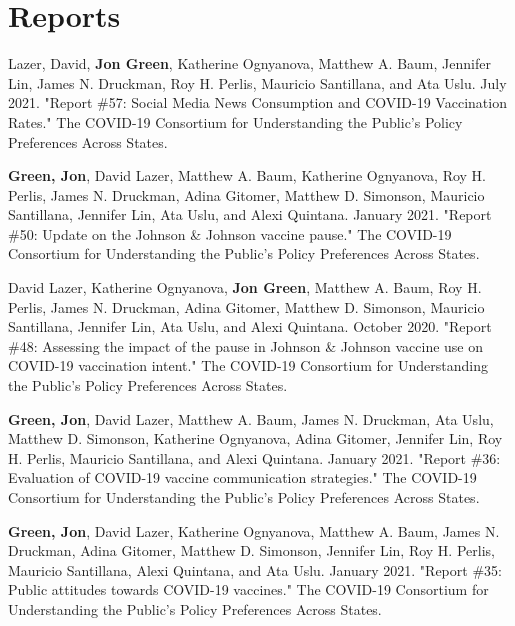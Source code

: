 \documentclass[letterpaper]{article}
\renewenvironment{itemize}{
  \begin{list}{}{
    \setlength{\leftmargin}{1.5em}
  }
}{
  \end{list}
}
\begin{document}
\section*{Reports}

\begin{itemize}

\item  Lazer, David, \textbf{Jon Green},  Katherine Ognyanova, Matthew A. Baum, Jennifer Lin, James N. Druckman, Roy H. Perlis, Mauricio Santillana, and Ata Uslu. July 2021. "Report \#57: Social Media News Consumption and COVID-19 Vaccination Rates." The COVID-19 Consortium for Understanding the Public’s Policy Preferences Across States.

\item  \textbf{Green, Jon}, David Lazer, Matthew A. Baum, Katherine Ognyanova, Roy H. Perlis, James N. Druckman, Adina Gitomer, Matthew D. Simonson, Mauricio Santillana, Jennifer Lin, Ata Uslu, and Alexi Quintana. January 2021. "Report \#50: Update on the Johnson \& Johnson vaccine pause." The COVID-19 Consortium for Understanding the Public’s Policy Preferences Across States.

\item David Lazer, Katherine Ognyanova, \textbf{Jon Green}, Matthew A. Baum, Roy H. Perlis, James N. Druckman, Adina Gitomer, Matthew D. Simonson, Mauricio Santillana, Jennifer Lin, Ata Uslu, and Alexi Quintana. October 2020. "Report \#48: Assessing the impact of the pause in Johnson \& Johnson vaccine use on COVID-19 vaccination intent." The COVID-19 Consortium for Understanding the Public’s Policy Preferences Across States.

\item  \textbf{Green, Jon}, David Lazer, Matthew A. Baum, James N. Druckman, Ata Uslu, Matthew D. Simonson, Katherine Ognyanova, Adina Gitomer, Jennifer Lin, Roy H. Perlis, Mauricio Santillana, and Alexi Quintana. January 2021. "Report \#36: Evaluation of COVID-19 vaccine communication strategies." The COVID-19 Consortium for Understanding the Public’s Policy Preferences Across States.

\item  \textbf{Green, Jon}, David Lazer, Katherine Ognyanova, Matthew A. Baum, James N. Druckman, Adina Gitomer, Matthew D. Simonson, Jennifer Lin, Roy H. Perlis, Mauricio Santillana, Alexi Quintana, and Ata Uslu. January 2021. "Report \#35: Public attitudes towards COVID-19 vaccines." The COVID-19 Consortium for Understanding the Public’s Policy Preferences Across States.


\end{itemize}
\end{document}
